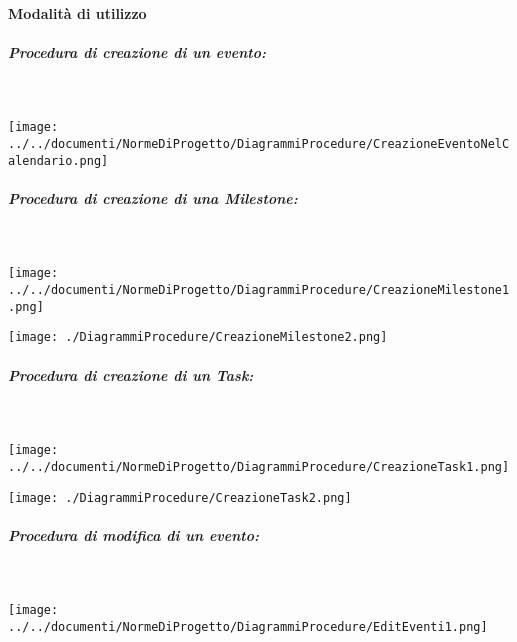 \paragraph{Modalità di utilizzo} \label{sec:procedure_teamwork}\mbox{}
\begin{samepage}
	\subparagraph{Procedura di creazione di un evento:}\mbox{}\\
	\begin{center}
		\texttt{[image: ../../documenti/NormeDiProgetto/DiagrammiProcedure/CreazioneEventoNelCalendario.png]}
	\end{center}
\end{samepage}

\begin{samepage}
	\subparagraph{Procedura di creazione di una Milestone:}\mbox{}\\	
	\begin{center}
		\texttt{[image: ../../documenti/NormeDiProgetto/DiagrammiProcedure/CreazioneMilestone1.png]}
	\end{center}
\end{samepage}

\begin{center}
	\texttt{[image: ./DiagrammiProcedure/CreazioneMilestone2.png]}
\end{center}

\begin{samepage}
	\subparagraph{Procedura di creazione di un Task:}\mbox{}\\
	
	\begin{center}
		\texttt{[image: ../../documenti/NormeDiProgetto/DiagrammiProcedure/CreazioneTask1.png]}
	\end{center}
	
\end{samepage}

\begin{center}
	\texttt{[image: ./DiagrammiProcedure/CreazioneTask2.png]}
\end{center}

\begin{samepage}
	\subparagraph{Procedura di modifica di un evento:}\mbox{}\\
	
	\begin{center}
		\texttt{[image: ../../documenti/NormeDiProgetto/DiagrammiProcedure/EditEventi1.png]}
	\end{center}
	
\end{samepage}

